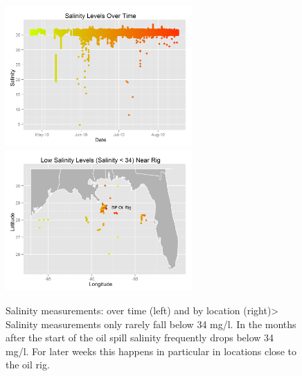 \documentclass[authoryear,12pt]{elsarticle}
\begin{document}
\begin{figure}[htbp] %
   \centering
   \includegraphics[width=2.8in]{salinity-time.png} 
   \includegraphics[width=2.8in]{salinity-map.png} 
   \caption{Salinity measurements: over time (left) and by location (right)> Salinity measurements only rarely fall below 34 mg/l. In the months after the start of the oil spill salinity frequently drops below 34 mg/l. For later weeks this happens in particular in locations close to the oil rig.}
   \label{salinity-timeline}
\end{figure}
\end{document}
